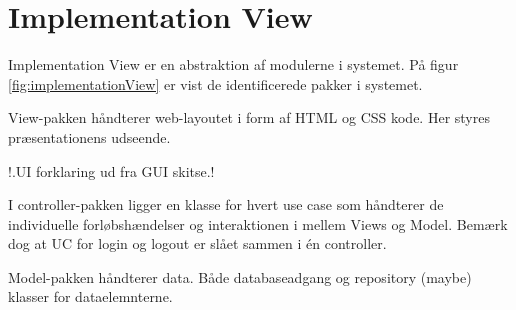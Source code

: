\section{Implementation View}
Implementation View er en abstraktion af modulerne i systemet. På figur \ref{fig:implementationView} er vist de identificerede pakker i systemet.


View-pakken håndterer web-layoutet i form af HTML og CSS kode. Her styres præsentationens udseende.

!.UI forklaring ud fra GUI skitse.!

I controller-pakken ligger en klasse for hvert use case som håndterer de individuelle forløbshændelser og interaktionen i mellem Views og Model. Bemærk dog at UC for login og logout er slået sammen i én controller.

Model-pakken håndterer data. Både databaseadgang og repository (maybe) klasser for dataelemnterne.